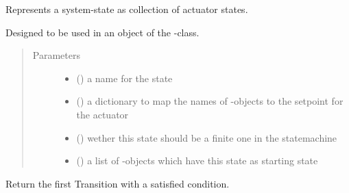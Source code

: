 \documentclass[a4paper,12pt,twoside]{article}
\begin{document}
\begin{fulllineitems}
\label{\detokenize{osbk_operation:osbk_operation.utility.State}}
Represents a system-state as collection of actuator states.

Designed to be used in an object of the -class.
\begin{quote}\begin{description}
\item[{Parameters}] \leavevmode\begin{itemize}
\item {} 
 () \textendash{} a name for the state

\item {} 
 () \textendash{} a dictionary to map the names of -objects to the
setpoint for the actuator

\item {} 
 () \textendash{} wether this state should be a finite one in the statemachine

\item {} 
 (\sphinxstyleliteralemphasis{\sphinxupquote{{[}}}{\hyperref[\detokenize{osbk_operation:osbk_operation.utility.Transition}]{\sphinxcrossref{\sphinxstyleliteralemphasis{\sphinxupquote{Transition}}}}}\sphinxstyleliteralemphasis{\sphinxupquote{{]}}}) \textendash{} a list of -objects which have this state as starting
state

\end{itemize}

\end{description}\end{quote}

\begin{fulllineitems}
\label{\detokenize{osbk_operation:osbk_operation.utility.State.check_exit_conditions}}
Return the first Transition with a satisfied condition.

\end{fulllineitems}


\end{fulllineitems}
\end{document}
